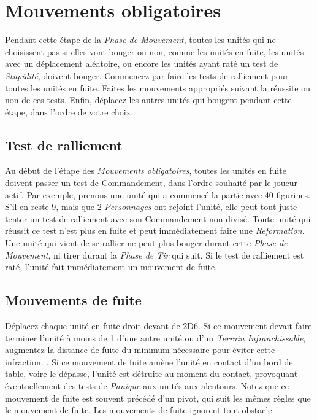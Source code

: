 \section{Mouvements obligatoires}

Pendant cette étape de la \emph{Phase de Mouvement}, toutes les unités qui ne choisissent pas si elles vont bouger ou non, comme les unités en fuite, les unités avec un déplacement aléatoire, ou encore les unités ayant raté un test de \emph{Stupidité}, doivent bouger. Commencez par faire les tests de ralliement pour toutes les unités en fuite. Faites les mouvements appropriés suivant la réussite ou non de ces tests. Enfin, déplacez les autres unités qui bougent pendant cette étape, dans l'ordre de votre choix.

\subsection{Test de ralliement}

Au début de l'étape des \emph{Mouvements obligatoires}, toutes les unités en fuite doivent passer un test de Commandement, dans l'ordre souhaité par le joueur actif.  Par exemple, prenons une unité qui a commencé la partie avec 40 figurines. S'il en reste 9, mais que 2 \emph{Personnages} ont rejoint l'unité, elle peut tout juste tenter un test de ralliement avec son Commandement non divisé. Toute unité qui réussit ce test n'est plus en fuite et peut immédiatement faire une \emph{Reformation}. Une unité qui vient de se rallier ne peut plus bouger durant cette \emph{Phase de Mouvement}, ni tirer durant la \emph{Phase de Tir} qui suit. Si le test de ralliement est raté, l'unité fait immédiatement un mouvement de fuite.

\subsection{Mouvements de fuite}

Déplacez chaque unité en fuite droit devant de \unit{2D6}{\pouce}. Si ce mouvement devait faire terminer l'unité à moins de \unit{1}{\pouce} d'une autre unité ou d'un \emph{Terrain Infranchissable}, augmentez la distance de fuite du minimum nécessaire pour éviter cette infraction. . Si ce mouvement de fuite amène l'unité en contact d'un bord de table, voire le dépasse, l'unité est détruite au moment du contact, provoquant éventuellement des tests de \emph{Panique} aux unités aux alentours. Notez que ce mouvement de fuite est souvent précédé d'un pivot, qui suit les mêmes règles que le mouvement de fuite. Les mouvements de fuite ignorent tout obstacle.

